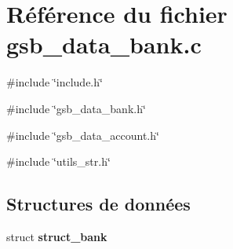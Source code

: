 \section{Référence du fichier gsb\_\-data\_\-bank.c}
\label{gsb__data__bank_8c}
{\ttfamily \#include \char`\"{}include.h\char`\"{}}\par
{\ttfamily \#include \char`\"{}gsb\_\-data\_\-bank.h\char`\"{}}\par
{\ttfamily \#include \char`\"{}gsb\_\-data\_\-account.h\char`\"{}}\par
{\ttfamily \#include \char`\"{}utils\_\-str.h\char`\"{}}\par
\subsection*{Structures de données}
\begin{DoxyCompactItemize}
\item 
struct {\bf struct\_\-bank}
\end{DoxyCompactItemize}
